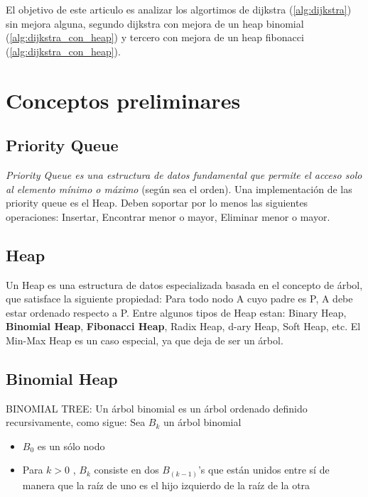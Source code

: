 \documentclass[a4paper,twocolumn,10pt]{article}
\begin{document}
El objetivo de este articulo es analizar los algortimos de dijkstra (\ref{alg:dijkstra}) sin mejora alguna, 
segundo dijkstra con mejora de un heap binomial (\ref{alg:dijkstra_con_heap}) 
y tercero con mejora de un heap fibonacci (\ref{alg:dijkstra_con_heap}).

\section{Conceptos preliminares}

\subsection{Priority Queue}
\emph{Priority Queue es una estructura de datos fundamental que permite el acceso 
solo al elemento mínimo o máximo } \cite{libro_cormen} (según sea el orden). 
Una implementación de las priority queue es el Heap. Deben soportar por lo menos 
las siguientes operaciones: Insertar, Encontrar menor o mayor, Eliminar menor o mayor.
\subsection{Heap}
Un Heap es una estructura de datos especializada basada en el concepto de árbol, que satisface la 
siguiente propiedad: Para todo nodo A cuyo padre es P, A debe estar ordenado respecto a P.
Entre algunos tipos de Heap estan: Binary Heap, \textbf{Binomial Heap}, \textbf{Fibonacci Heap}, Radix Heap, 
d-ary Heap, Soft Heap, etc. El Min-Max Heap es un caso especial, ya que deja de ser un árbol.

\subsection{Binomial Heap}
BINOMIAL TREE: Un árbol binomial es un árbol ordenado definido recursivamente, como sigue:
Sea $B_k$ un árbol binomial
\begin{itemize}
\item $B_0$ es un sólo nodo
\item Para $k>0$ , $B_k$ consiste en dos $B_(k-1)$'s que están unidos entre sí de manera 
que la raíz de uno es el hijo izquierdo de la raíz de la otra
\end{itemize}
\end{document}
